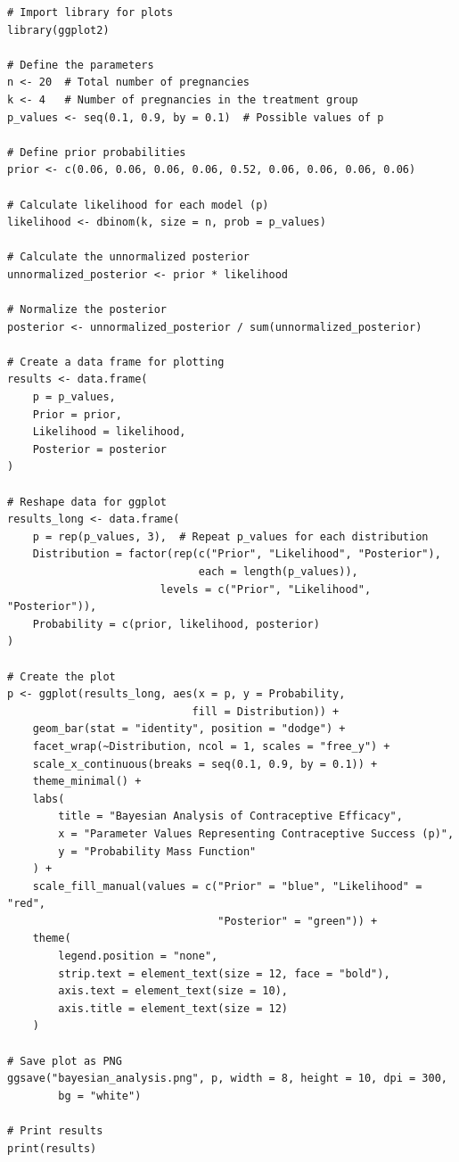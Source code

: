 \begin{lstlisting}[style=Rstyle, label={lst:bayesian_analysis}]
# Import library for plots
library(ggplot2)

# Define the parameters
n <- 20  # Total number of pregnancies
k <- 4   # Number of pregnancies in the treatment group
p_values <- seq(0.1, 0.9, by = 0.1)  # Possible values of p

# Define prior probabilities
prior <- c(0.06, 0.06, 0.06, 0.06, 0.52, 0.06, 0.06, 0.06, 0.06)

# Calculate likelihood for each model (p)
likelihood <- dbinom(k, size = n, prob = p_values)

# Calculate the unnormalized posterior
unnormalized_posterior <- prior * likelihood

# Normalize the posterior
posterior <- unnormalized_posterior / sum(unnormalized_posterior)

# Create a data frame for plotting
results <- data.frame(
    p = p_values,
    Prior = prior,
    Likelihood = likelihood,
    Posterior = posterior
)

# Reshape data for ggplot
results_long <- data.frame(
    p = rep(p_values, 3),  # Repeat p_values for each distribution
    Distribution = factor(rep(c("Prior", "Likelihood", "Posterior"), 
                              each = length(p_values)), 
                        levels = c("Prior", "Likelihood", "Posterior")),
    Probability = c(prior, likelihood, posterior)
)

# Create the plot
p <- ggplot(results_long, aes(x = p, y = Probability, 
                             fill = Distribution)) +
    geom_bar(stat = "identity", position = "dodge") +
    facet_wrap(~Distribution, ncol = 1, scales = "free_y") +
    scale_x_continuous(breaks = seq(0.1, 0.9, by = 0.1)) +  
    theme_minimal() +
    labs(
        title = "Bayesian Analysis of Contraceptive Efficacy",
        x = "Parameter Values Representing Contraceptive Success (p)",
        y = "Probability Mass Function"
    ) +
    scale_fill_manual(values = c("Prior" = "blue", "Likelihood" = "red", 
                                 "Posterior" = "green")) +
    theme(
        legend.position = "none",
        strip.text = element_text(size = 12, face = "bold"),
        axis.text = element_text(size = 10),
        axis.title = element_text(size = 12)
    )

# Save plot as PNG
ggsave("bayesian_analysis.png", p, width = 8, height = 10, dpi = 300, 
        bg = "white")

# Print results
print(results)
\end{lstlisting}

